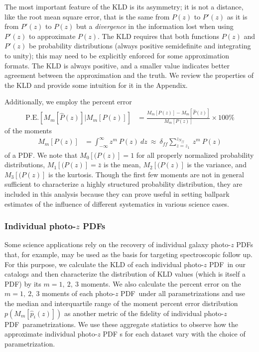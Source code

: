 \documentclass[\docopts]{\docclass}
\newcommand{\pz}{photo-$z$ PDF}
\begin{document}
The most important feature of the KLD is its asymmetry; it is not a distance, 
like the root mean square error, that is the same from $P(z)$ to $P'(z)$ as it 
is from $P'(z)$ to $P(z)$ but a \textit{divergence} in the information lost 
when using $P'(z)$ to approximate $P(z)$.
The KLD requires that both functions $P(z)$ and $P'(z)$ be probability 
distributions (always positive semidefinite and integrating to unity); this may 
need to be explicitly enforced for some approximation formats.
The KLD is always positive, and a smaller value indicates better agreement 
between the approximation and the truth.
We review the properties of the KLD and provide some intuition for it in the 
Appendix.

Additionally, we employ the percent error
\begin{align}
  \label{eq:percent_error}
  \mathrm{P.E.}[M_{m}[\hat{P}(z)] | M_{m}[P(z)]] &= \frac{M_{m}[P(z)] - 
M_{m}[\hat{P}(z)]}{M_{m}[P(z)]}\times100\%
\end{align}
of the moments
\begin{align}
  \label{eq:moment}
  M_{m}[P(z)] &= \int_{-\infty}^{\infty} z^{m}\ P(z)\ dz\ \approx\  
\delta_{ff}\sum_{z=z_{1}}^{z_{N_{ff}}}\ z^{m}\ P(z)
\end{align}
 of a PDF.
We note that $M_{0}[(P(z)]=1$ for all properly normalized probability 
distributions, $M_{1}[(P(z)]=\bar{z}$ is the mean, $M_{2}[(P(z)]$ is the 
variance, and $M_{3}[(P(z)]$ is the kurtosis.
Though the first few moments are not in general sufficient to characterize a 
highly structured probability distribution, they are included in this analysis 
because they can prove useful in setting ballpark estimates of the influence of 
different systematics in various science cases.

\subsubsection{Individual \pz s}
\label{sec:individual_metric}

Some science applications rely on the recovery of individual galaxy \pz s that, 
for example, may be used as the basis for targeting spectroscopic follow up.
For this purpose, we calculate the KLD of each individual \pz\ in our catalogs 
and then characterize the distribution of KLD values (which is itself a PDF) by 
its $m=1,\ 2,\ 3$ moments.
We also calculate the percent error on the $m=1,\ 2,\ 3$ moments of each \pz\ 
under all parametrizations and use the median and interquartile range of the 
moment percent error distribution $p(M_{m}[\hat{p}_{i}(z)])$ as another metric 
of the fidelity of individual \pz\ parametrizations.
We use these aggregate statistics to observe how the approximate individual \pz 
s for each dataset vary with the choice of parametrization.
\end{document}
